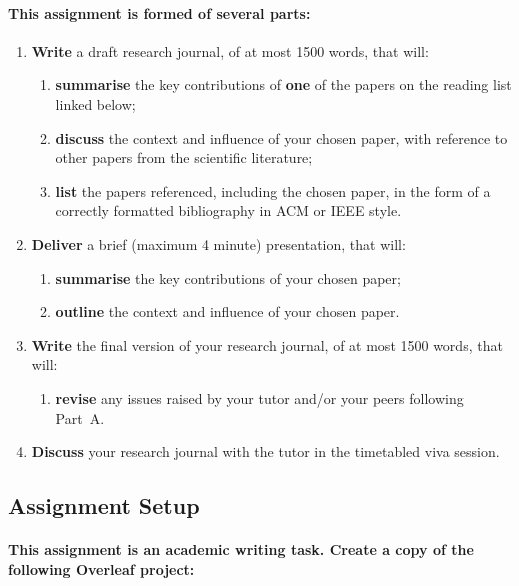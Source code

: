 \documentclass{../../fal_assignment}
\begin{document}
\paragraph{
This assignment is formed of several parts:
}

\begin{enumerate}[label=(\Alph*)]
    \item \textbf{Write} a draft research journal, of at most 1500 words, that will:
    	\begin{enumerate}[label=(\roman*)]
    		\item \textbf{summarise} the key contributions of \textbf{one} of the papers on the reading list linked below;
    		\item \textbf{discuss} the context and influence of your chosen paper, with reference to other
    			papers from the scientific literature;
    		\item \textbf{list} the papers referenced, including the chosen paper,
    			in the form of a correctly formatted bibliography in ACM or IEEE style.
    	\end{enumerate}
	\item \textbf{Deliver} a brief (maximum 4 minute) presentation, that will:
    	\begin{enumerate}[label=(\roman*)]
    		\item \textbf{summarise} the key contributions of your chosen paper;
    		\item \textbf{outline} the context and influence of your chosen paper.
    	\end{enumerate}
    \item \textbf{Write} the final version of your research journal, of at most 1500 words, that will:
    	\begin{enumerate}[label=(\roman*)]
    		\item \textbf{revise} any issues raised by your tutor and/or your peers following Part~A.
    	\end{enumerate}
    \item \textbf{Discuss} your research journal with the tutor in the timetabled viva session.
\end{enumerate}

\subsection*{Assignment Setup}

\paragraph{
This assignment is an \textbf{academic writing task}. Create a copy of the following Overleaf project:
}
\end{document}

